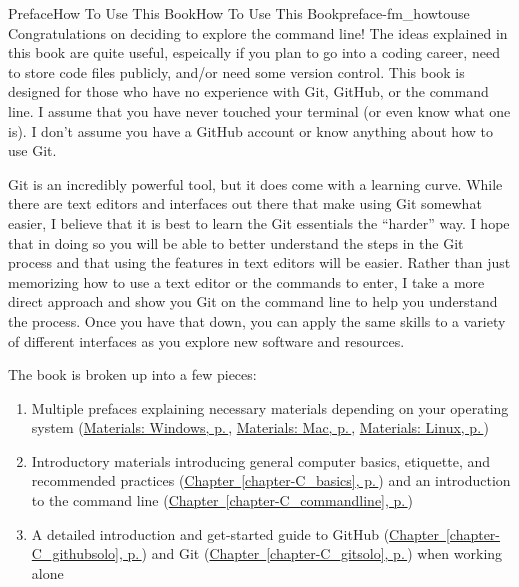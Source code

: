 \documentclass[twoside,10pt,]{book}
\newcommand{\xreffont}{\relax}
\begin{document}
%
%
\typeout{************************************************}
\typeout{************************************************}
%
\begin{preface}{Preface}{How To Use This Book}{}{How To Use This Book}{}{}{preface-fm_howtouse}
Congratulations on deciding to explore the command line! The ideas explained in this book are quite useful, espeically if you plan to go into a coding career, need to store code files publicly, and\slash{}or need some version control. This book is designed for those who have no experience with Git, GitHub, or the command line. I assume that you have never touched your terminal (or even know what one is). I don't assume you have a GitHub account or know anything about how to use Git.%
\par
Git is an incredibly powerful tool, but it does come with a learning curve. While there are text editors and interfaces out there that make using Git somewhat easier, I believe that it is best to learn the Git essentials the ``harder'' way. I hope that in doing so you will be able to better understand the steps in the Git process and that using the features in text editors will be easier. Rather than just memorizing how to use a text editor or the commands to enter, I take a more direct approach and show you Git on the command line to help you understand the process. Once you have that down, you can apply the same skills to a variety of different interfaces as you explore new software and resources.%
\par
The book is broken up into a few pieces:%
\begin{enumerate}
\item{}Multiple prefaces explaining necessary materials depending on your operating system (\hyperref[preface-materials-windows]{Materials: Windows, p.\,\pageref{preface-materials-windows}}, \hyperref[preface-materials-mac]{Materials: Mac, p.\,\pageref{preface-materials-mac}}, \hyperref[preface-materials-linux]{Materials: Linux, p.\,\pageref{preface-materials-linux}})%
\item{}Introductory materials introducing general computer basics, etiquette, and recommended practices (\hyperref[chapter-C_basics]{Chapter~{\xreffont\ref{chapter-C_basics}}, p.\,\pageref{chapter-C_basics}}) and an introduction to the command line (\hyperref[chapter-C_commandline]{Chapter~{\xreffont\ref{chapter-C_commandline}}, p.\,\pageref{chapter-C_commandline}})%
\item{}A detailed introduction and get-started guide to GitHub (\hyperref[chapter-C_githubsolo]{Chapter~{\xreffont\ref{chapter-C_githubsolo}}, p.\,\pageref{chapter-C_githubsolo}}) and Git (\hyperref[chapter-C_gitsolo]{Chapter~{\xreffont\ref{chapter-C_gitsolo}}, p.\,\pageref{chapter-C_gitsolo}}) when working alone%

\end{enumerate}
\end{preface}
\end{document}

